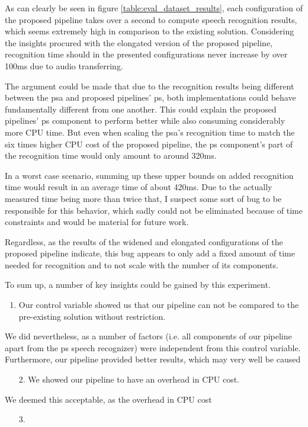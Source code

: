 { %
As can clearly be seen in figure \ref{table:eval_dataset_results}, each configuration of the proposed pipeline takes over a second to compute speech recognition results, which seems extremely high in comparison to the existing solution.
Considering the insights procured with the elongated version of the proposed pipeline, recognition time should in the presented configurations never increase by over 100ms due to audio transferring.

The argument could be made that due to the recognition results being different between the \gls{psa} and proposed pipelines' \gls{ps}, both implementations could behave fundamentally different from one another.
This could explain the proposed pipelines' \gls{ps} component to perform better while also consuming considerably more CPU time.
But even when scaling the \gls{psa}'s recognition time to match the six times higher CPU cost of the proposed pipeline, the \gls{ps} component's part of the recognition time would only amount to around 320ms.

In a worst case scenario, summing up these upper bounds on added recognition time would result in an average time of about 420ms.  
Due to the actually measured time being more than twice that, I suspect some sort of bug to be responsible for this behavior, which sadly could not be eliminated because of time constraints and would be material for future work.

Regardless, as the results of the widened and elongated configurations of the proposed pipeline indicate, this bug appears to only add a fixed amount of time needed for recognition and to not scale with the number of its components. 
}

To sum up, a number of key insights could be gained by this experiment.

\begin{enumerate}
	\item Our control variable showed us that our pipeline can not be compared to the pre-existing solution without restriction.
\end{enumerate}
We did nevertheless, as a number of factors (i.e. all components of our pipeline apart from the \gls{ps} speech recognizer) were independent from this control variable.
Furthermore, our pipeline provided better results, which may very well be caused 


\begin{enumerate}
	\item[2.] We showed our pipeline to have an overhead in CPU cost.
\end{enumerate}
We deemed this acceptable, as the overhead in CPU cost 

\begin{enumerate}
	\item[3.] 
\end{enumerate}




